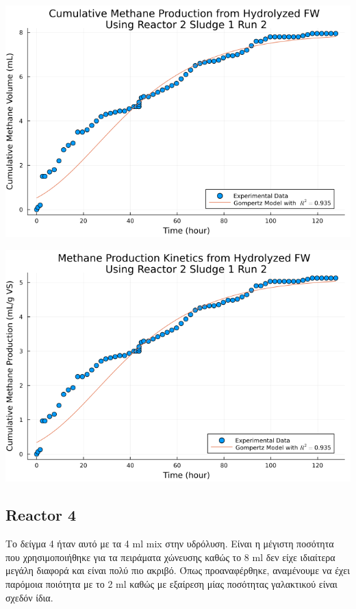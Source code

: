 \documentclass[11pt]{article}
\begin{document}
\begin{center}
\includegraphics[width=.9\linewidth]{../plots/BMPs/Hydrolyzed FW/methane_kinetics_hydrolysate_2_s1_r2_hour.png}
\end{center}

\begin{center}
\includegraphics[width=.9\linewidth]{../plots/BMPs/Hydrolyzed FW/specific_methane_kinetics_hydrolysate_2_s1_r2_hour.png}
\end{center}

\subsection{Reactor 4}
\label{sec:org54bd4e8}
Το δείγμα 4 ήταν αυτό με τα 4 ml mix στην υδρόλυση. Είναι η μέγιστη ποσότητα που χρησιμοποιήθηκε για τα πειράματα χώνευσης καθώς το 8 ml δεν είχε ιδιαίτερα μεγάλη διαφορά και είναι πολύ πιο ακριβό. Όπως προαναφέρθηκε, αναμένουμε να έχει παρόμοια ποιότητα με το 2 ml καθώς με εξαίρεση μίας ποσότητας γαλακτικού είναι σχεδόν ίδια.
\end{document}
